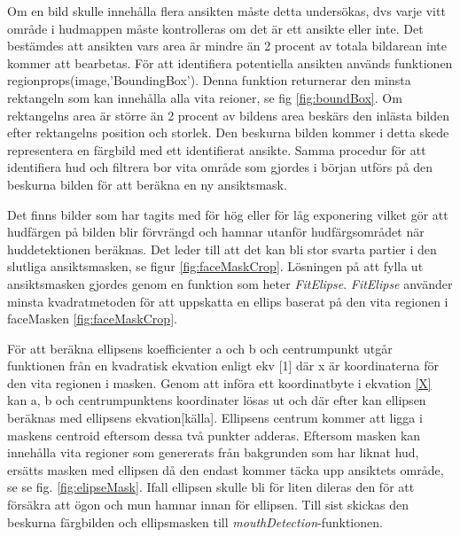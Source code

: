 \documentclass[a4paper,12pt,oneside,final]{extbook}
\begin{document}
Om en bild skulle innehålla flera ansikten måste detta undersökas, dvs varje vitt område i hudmappen måste kontrolleras om det är ett ansikte eller inte. Det bestämdes att ansikten vars area är mindre än 2 procent av totala bildarean inte kommer att bearbetas. För att identifiera potentiella ansikten används funktionen regionprops(image,'BoundingBox'). Denna funktion returnerar den minsta rektangeln som kan innehålla alla vita reioner, se fig \ref{fig:boundBox}. Om rektangelns area är större än 2 procent av bildens area beskärs den inlästa bilden efter rektangelns position och storlek. Den beskurna bilden kommer i detta skede representera en färgbild med ett identifierat ansikte. Samma procedur för att identifiera hud och filtrera bor vita område som gjordes i början utförs på den beskurna bilden för att beräkna en ny ansiktsmask.

Det finns bilder som har tagits med för hög eller för låg exponering vilket gör att hudfärgen på bilden blir förvrängd och hamnar utanför hudfärgsområdet när huddetektionen beräknas. Det leder till att det kan bli stor svarta partier i den slutliga ansiktsmasken, se figur \ref{fig:faceMaskCrop}. Lösningen på att fylla ut ansiktsmasken gjordes genom en funktion som heter \textit{FitElipse}. \textit{FitElipse} använder minsta kvadratmetoden för att uppskatta en ellips baserat på den vita regionen i faceMasken \ref{fig:faceMaskCrop}. 

För att beräkna ellipsens koefficienter a och b och centrumpunkt utgår funktionen från en kvadratisk ekvation enligt ekv [1] där x är koordinaterna för den vita regionen i masken. Genom att införa ett koordinatbyte i ekvation \ref{X} kan a, b och centrumpunktens koordinater lösas ut och där efter kan ellipsen beräknas med ellipsens ekvation[källa]. Ellipsens centrum kommer att ligga i maskens centroid eftersom dessa två punkter adderas. Eftersom masken kan innehålla vita regioner som genererats från bakgrunden som har liknat hud, ersätts masken med ellipsen då den endast kommer täcka upp ansiktets område, se se fig. \ref{fig:elipseMask}. Ifall ellipsen skulle bli för liten dileras den för att försäkra att ögon och mun hamnar innan för ellipsen.
Till sist skickas den beskurna färgbilden och ellipsmasken till \textit{mouthDetection}-funktionen.
\end{document}
